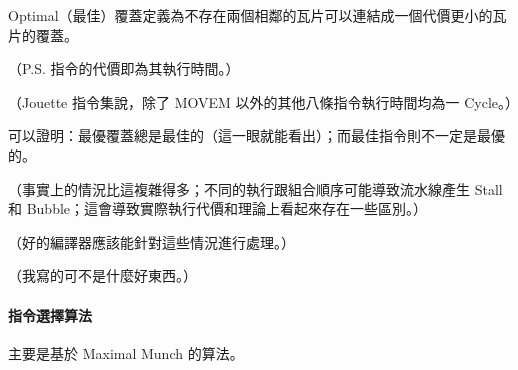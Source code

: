 \documentclass[
]{article}
\begin{document}
Optimal（最佳）覆蓋定義為不存在兩個相鄰的瓦片可以連結成一個代價更小的瓦片的覆蓋。

（P.S. 指令的代價即為其執行時間。）

（Jouette 指令集說，除了 MOVEM 以外的其他八條指令執行時間均為一
Cycle。）

可以證明：最優覆蓋總是最佳的（這一眼就能看出）；而最佳指令則不一定是最優的。

（事實上的情況比這複雜得多；不同的執行跟組合順序可能導致流水線產生 Stall
和 Bubble；這會導致實際執行代價和理論上看起來存在一些區別。）

（好的編譯器應該能針對這些情況進行處理。）

（我寫的可不是什麼好東西。）

\hypertarget{header-n325}{%
\paragraph{指令選擇算法}\label{header-n325}}

主要是基於 Maximal Munch 的算法。
\end{document}
